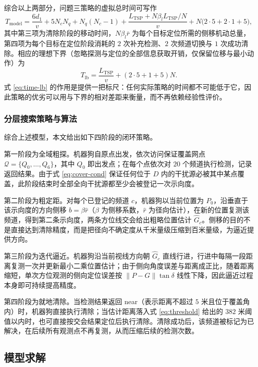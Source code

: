 \documentclass[12pt,a4paper]{ctexart}
\begin{document}
综合以上两部分，问题三策略的虚拟总时间可写作
\begin{equation}
T_{\mathrm{model}}=\frac{6d_1}{v}+5N_cN_q+N_q(N_c-1)
+\frac{L_{\mathrm{TSP}}+N\beta_l L_{\mathrm{TSP}}/N}{v}
+N\bigl(2\cdot5+2\cdot1+5\bigr),
\label{eq:time-total}
\end{equation}
其中第三项为清除阶段的移动时间，$N\beta_l\bar r$ 为每个目标定位所需的侧移机动总量，第四项为每个目标在定位阶段消耗的 $2$ 次补充检测、$2$ 次频道切换与 $1$ 次成功清除。相应的理想下界（忽略探测与定位的全部信息获取开销，仅保留位移与最小动作）为
\begin{equation}
T_{\mathrm{lb}}=\frac{L_{\mathrm{TSP}}}{v}+(2\cdot5+1+5)N .
\label{eq:time-lb}
\end{equation}
式 \eqref{eq:time-lb} 的作用是提供一把标尺：任何实际策略的时间都不可能低于它，因此策略的优劣可以用与下界的相对差距来衡量，而不再依赖经验性评价。

\subsubsection{分层搜索策略与算法}

综合上述模型，本文给出如下四阶段的闭环策略。

第一阶段为全域粗探。机器狗自原点出发，依次访问保证覆盖网点 $\mathcal Q=\{Q_0,\dots,Q_6\}$，其中 $Q_0$ 即出发点；在每个点依次对 $20$ 个频道执行检测，记录返回结果。由于式 \eqref{eq:cover-cond} 保证任何位于 $D$ 内的干扰源必被其中某点覆盖，此阶段结束时全部全向干扰源都至少会被登记一次示向度。

第二阶段为粗定距。对每个已登记的频道 $c$，机器狗以当前位置为 $P_0$，沿垂直于该示向度的方向侧移 $b=\beta\hat r$（$\beta$ 为侧移系数，$\hat r$ 为径向估计），在新的位置复测该频道，得到第二条示向度，两条方位线交会给出粗略位置估计 $\hat G_c$。侧移的目的不是直接达到清除精度，而是把径向不确定度从千米量级压缩到百米量级，为逼近提供方向。

第三阶段为迭代逼近。机器狗沿当前视线方向朝 $\hat G_c$ 直线行进，行进中每隔一段距离复测一次并更新最小二乘位置估计；由于侧向角度误差与距离成正比，随着距离缩短，单次方位观测的侧向定位误差按 $\lVert P-G\rVert\tan\delta$ 线性下降，因此逼近过程本身即可持续提高精度。

第四阶段为就地清除。当检测结果返回 near（表示距离不超过 $5$ 米且位于覆盖角内）时，机器狗直接执行清除；当估计距离落入式 \eqref{eq:threshold} 给出的 $382$ 米阈值以内时，也可直接按交会结果定位后执行清除。清除成功后，该频道被标记为已解决，在后续所有观测点不再复测，从而压缩后续的检测次数。

\subsection{模型求解}
\end{document}
